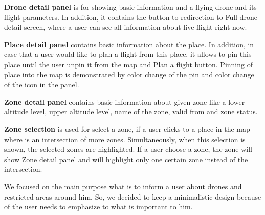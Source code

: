 \textbf{Drone detail panel} is for showing basic information and a flying drone and its flight parameters.
In addition, it contains the button to redirection to Full drone detail screen, where a user can see all information about live flight right now.

\textbf{Place detail panel} contains basic information about the place.
In addition, in case that a user would like to plan a flight from this place, it allows to pin this place until the user unpin it from the map and Plan a flight button.
Pinning of place into the map is demonstrated by color change of the pin and color change of the icon in the panel.

\textbf{Zone detail panel} contains basic information about given zone like a lower altitude level, upper altitude level, name of the zone, valid from and zone status.

\textbf{Zone selection} is used for select a zone, if a user clicks to a place in the map where is an intersection of more zones.
Simultaneously, when this selection is shown, the selected zones are highlighted.
If a user choose a zone, the zone will show Zone detail panel and will highlight only one certain zone instead of the intersection.

We focused on the main purpose what is to inform a user about drones and restricted areas around him.
So, we decided to keep a minimalistic design because of the user needs to emphasize to what is important to him.



